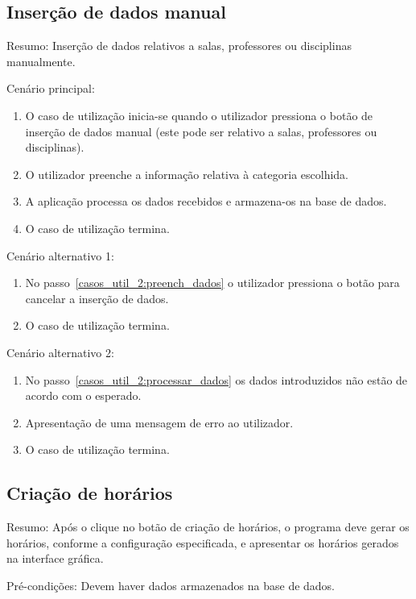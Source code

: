\subsection{Inserção de dados manual}
Resumo: Inserção de dados relativos a salas, professores ou disciplinas manualmente.

Cenário principal:

\begin{enumerate}
    \item O caso de utilização inicia-se quando o utilizador pressiona o botão de inserção de dados manual (este pode ser relativo a salas, professores ou disciplinas).
    \item O utilizador preenche a informação relativa à categoria escolhida. \label{casos_util_2:preench_dados}
    \item A aplicação processa os dados recebidos e armazena-os na base de dados. \label{casos_util_2:processar_dados}
    \item O caso de utilização termina.
\end{enumerate}

Cenário alternativo 1:

\begin{enumerate}
    \item No passo~\ref{casos_util_2:preench_dados} o utilizador pressiona o botão para cancelar a inserção de dados.
    \item O caso de utilização termina.
\end{enumerate}

Cenário alternativo 2:

\begin{enumerate}
    \item No passo~\ref{casos_util_2:processar_dados} os dados introduzidos não estão de acordo com o esperado.
    \item Apresentação de uma mensagem de erro ao utilizador.
    \item O caso de utilização termina.
\end{enumerate}

\subsection{Criação de horários}
Resumo: Após o clique no botão de criação de horários, o programa deve gerar os horários, conforme a configuração especificada, e apresentar os horários gerados na interface gráfica.

Pré-condições: Devem haver dados armazenados na base de dados.


